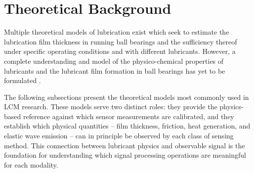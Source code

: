 
\section{Theoretical Background}
\label{sec:theory}

Multiple theoretical models of lubrication exist which seek to estimate the lubrication film thickness in running ball bearings and the sufficiency thereof under specific operating conditions and with different lubricants. However, a complete understanding and model of the physico-chemical properties of lubricants and the lubricant film formation in ball bearings has yet to be formulated \cite{cen_ehl_2021} \cite{dai_situ_2024} \cite{li_lubrication_2026}.

The following subsections present the theoretical models most commonly used in LCM research. These models serve two distinct roles: they provide the physics-based reference against which sensor measurements are calibrated, and they establish which physical quantities -- film thickness, friction, heat generation, and elastic wave emission -- can in principle be observed by each class of sensing method. This connection between lubricant physics and observable signal is the foundation for understanding which signal processing operations are meaningful for each modality.

